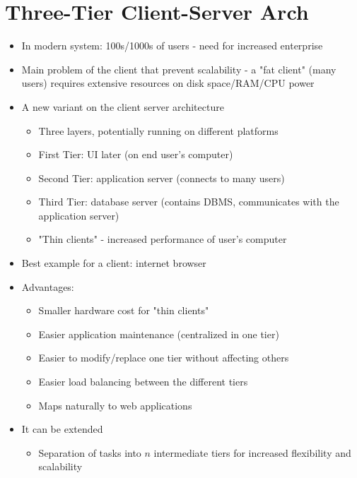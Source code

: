 \documentclass{article}[18pt]
\begin{document}
\section{Three-Tier Client-Server Arch}
\begin{itemize}
	\item In modern system: 100s/1000s of users - need for increased enterprise 
	\item Main problem of the client that prevent scalability - a "fat client" (many users) requires extensive resources on disk space/RAM/CPU power
	\item A new variant on the client server architecture
	\begin{itemize}
		\item Three layers, potentially running on different platforms
		\item First Tier: UI later (on end user's computer)
		\item Second Tier: application server (connects to many users)
		\item Third Tier: database server (contains DBMS, communicates with the application server)
		\item "Thin clients" - increased performance of user's computer
	\end{itemize}
	\item Best example for a client: internet browser
	\item Advantages:
	\begin{itemize}
		\item Smaller hardware cost for "thin clients"
		\item Easier application maintenance (centralized in one tier)
		\item Easier to modify/replace one tier without affecting others
		\item Easier load balancing between the different tiers
		\item Maps naturally to web applications
	\end{itemize}
	\item It can be extended
	\begin{itemize}
		\item Separation of tasks into $n$ intermediate tiers for increased flexibility and scalability 
	\end{itemize}
\end{itemize}
\end{document}
